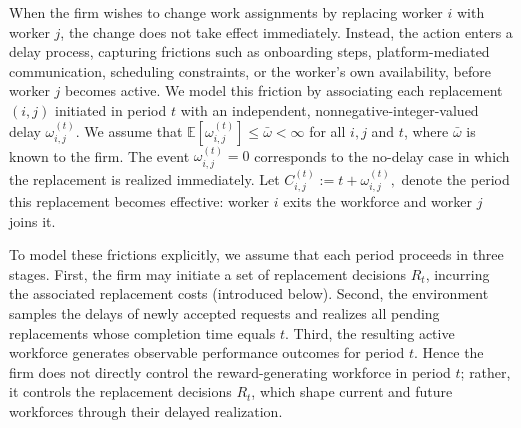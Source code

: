 \documentclass[opre,blindrev]{informs3}
\newcommand{\bE}[1]{{\mathbb{E}\left[#1\right]}}
\begin{document}
When the firm wishes to change work assignments by replacing worker \(i\) with worker \(j\), the change does not take effect immediately. Instead, the action enters a delay process, capturing frictions such as onboarding steps, platform-mediated communication, scheduling constraints, or the worker's own availability, before worker \(j\) becomes active. We model this friction by associating each replacement \((i,j)\) initiated in period \(t\) with an independent, nonnegative-integer-valued delay \(\omega_{i,j}^{(t)}\). We assume that \(\bE{\omega_{i,j}^{(t)}} \le \bar{\omega} < \infty\) for all \(i,j\) and \(t\), where \(\bar{\omega}\) is known to the firm. The event \(\omega_{i,j}^{(t)}=0\) corresponds to the no-delay case in which the replacement is realized immediately.
Let \(C_{i,j}^{(t)} := t + \omega_{i,j}^{(t)},\) denote the period this replacement becomes effective: worker \(i\) exits the workforce and worker \(j\) joins it.

To model these frictions explicitly, we assume that each period proceeds in three stages. First, the firm may initiate a set of replacement decisions \(R_t\), incurring the associated replacement costs (introduced below). Second, the environment samples the delays of newly accepted requests and realizes all pending replacements whose completion time equals \(t\). Third, the resulting active workforce generates observable performance outcomes for period \(t\). Hence the firm does not directly control the reward-generating workforce in period \(t\); rather, it controls the replacement decisions \(R_t\), which shape current and future workforces through their delayed realization.

\end{document}
